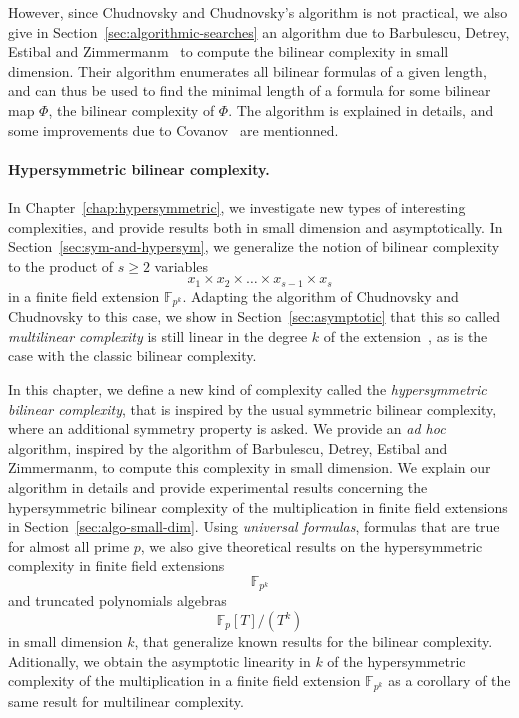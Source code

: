 However, since Chudnovsky and Chudnovsky's algorithm is not practical, we also
give in Section~\ref{sec:algorithmic-searches} an algorithm due to Barbulescu,
Detrey, Estibal and Zimmermanm~\cite{BDEZ12} to compute the bilinear complexity
in small dimension. Their algorithm enumerates all bilinear formulas of a given
length, and can thus be used to find the minimal length of a formula for some
bilinear map $\Phi$, \ie the bilinear complexity of $\Phi$. The
algorithm is explained in details, and some improvements due to
Covanov~\cite{Covanov19} are mentionned.

\paragraph{Hypersymmetric bilinear complexity.}
In Chapter~\ref{chap:hypersymmetric}, we investigate new types of interesting
complexities, and provide results both in small dimension and asymptotically.
In Section~\ref{sec:sym-and-hypersym}, we generalize the notion of bilinear
complexity to the product of $s\geq2$ variables
\[
  x_1\times x_2\times\dots\times x_{s-1}\times x_s
\]
in a finite field extension $\mathbb{F}_{p^k}$. Adapting the algorithm of
Chudnovsky and Chudnovsky to this case, we show in Section~\ref{sec:asymptotic}
that this so called \emph{multilinear complexity} is still linear in the degree
$k$ of the extension~\cite{RR21}, as is the case with the classic bilinear
complexity.

In this chapter, we define a new kind of complexity called the
\emph{hypersymmetric bilinear complexity}, that is inspired by the usual
symmetric bilinear complexity, where an additional symmetry property is asked.
We provide an \emph{ad hoc} algorithm, inspired by the algorithm of Barbulescu,
Detrey, Estibal and Zimmermanm, to compute this complexity in small dimension.
We explain our algorithm in details and provide experimental results concerning
the hypersymmetric bilinear complexity of the multiplication in finite field
extensions in Section~\ref{sec:algo-small-dim}. Using \emph{universal formulas},
\ie formulas that are true for almost all prime $p$, we also give theoretical
results on the hypersymmetric complexity in finite field extensions
\[
  \mathbb{F}_{p^{k}}
\]
and truncated polynomials algebras
\[
  \mathbb{F}_p[T]/(T^k)
\]
in small dimension $k$, that generalize known results for the bilinear
complexity. Aditionally, we obtain the asymptotic linearity in $k$ of the
hypersymmetric complexity of the multiplication in a finite field extension
$\mathbb{F}_{p^k}$ as a corollary of the same result for multilinear
complexity.


